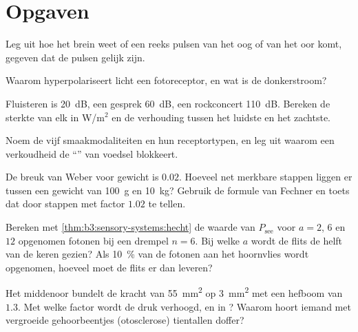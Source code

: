 \section{Opgaven}

\begin{exercise}[$\star$]\label{exo:b3:sensory-systems:1}
Leg uit hoe het brein weet of een reeks pulsen van het oog of van het
oor komt, gegeven dat de pulsen gelijk zijn.
\end{exercise}

\begin{exercise}[$\star$]\label{exo:b3:sensory-systems:2}
Waarom hyperpolariseert licht een fotoreceptor, en wat is de
donkerstroom?
\end{exercise}

\begin{exercise}[$\star$]\label{exo:b3:sensory-systems:3}
Fluisteren is \qty{20}{dB}, een gesprek \qty{60}{dB}, een rockconcert
\qty{110}{dB}. Bereken de sterkte van elk in W/m$^{2}$ en de verhouding
tussen het luidste en het zachtste.
\end{exercise}

\begin{exercise}[$\star$]\label{exo:b3:sensory-systems:4}
Noem de vijf smaakmodaliteiten en hun receptortypen, en leg uit waarom
een verkoudheid de ``'' van voedsel blokkeert.
\end{exercise}

\begin{exercise}[$\star\star$]\label{exo:b3:sensory-systems:5}
De breuk van Weber voor gewicht is $0.02$. Hoeveel net merkbare stappen
liggen er tussen een gewicht van \qty{100}{g} en \qty{10}{kg}? Gebruik
de formule van Fechner en toets dat door stappen met factor
$1.02$ te tellen.
\end{exercise}

\begin{exercise}[$\star\star$]\label{exo:b3:sensory-systems:6}
Bereken met \cref{thm:b3:sensory-systems:hecht} de waarde van
$P_{\text{see}}$ voor $a = 2$, $6$ en $12$ opgenomen fotonen bij een
drempel $n = 6$. Bij welke $a$ wordt de flits de helft van de keren
gezien? Als \qty{10}{\%} van de fotonen aan het hoornvlies wordt
opgenomen, hoeveel moet de flits er dan leveren?
\end{exercise}

\begin{exercise}[$\star\star$]\label{exo:b3:sensory-systems:7}
Het middenoor bundelt de kracht van \qty{55}{mm^2} op
\qty{3}{mm^2} met een hefboom van $1.3$. Met welke factor wordt de druk
verhoogd, en in ? Waarom hoort iemand met vergroeide
gehoorbeentjes (otosclerose) tientallen  doffer?
\end{exercise}

